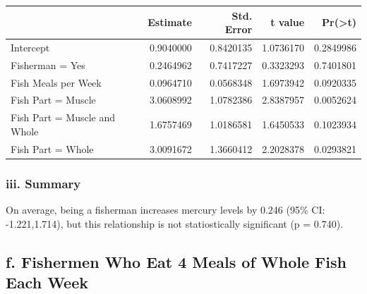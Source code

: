 \documentclass[]{article}
\newenvironment{Shaded}{\begin{snugshade}}{\end{snugshade}}
\newcommand{\DataTypeTok}[1]{\textcolor[rgb]{0.13,0.29,0.53}{#1}}
\newcommand{\KeywordTok}[1]{\textcolor[rgb]{0.13,0.29,0.53}{\textbf{#1}}}
\newcommand{\NormalTok}[1]{#1}
\newcommand{\OperatorTok}[1]{\textcolor[rgb]{0.81,0.36,0.00}{\textbf{#1}}}
\newcommand{\StringTok}[1]{\textcolor[rgb]{0.31,0.60,0.02}{#1}}
\begin{document}
\begin{Shaded}
\end{Shaded}

\begin{longtable}[]{@{}lrrrr@{}}
\toprule
& Estimate & Std. Error & t value &
Pr(\textgreater{}\textbar{}t\textbar{})\tabularnewline
\midrule
\endhead
Intercept & 0.9040000 & 0.8420135 & 1.0736170 & 0.2849986\tabularnewline
Fisherman = Yes & 0.2464962 & 0.7417227 & 0.3323293 &
0.7401801\tabularnewline
Fish Meals per Week & 0.0964710 & 0.0568348 & 1.6973942 &
0.0920335\tabularnewline
Fish Part = Muscle & 3.0608992 & 1.0782386 & 2.8387957 &
0.0052624\tabularnewline
Fish Part = Muscle and Whole & 1.6757469 & 1.0186581 & 1.6450533 &
0.1023934\tabularnewline
Fish Part = Whole & 3.0091672 & 1.3660412 & 2.2028378 &
0.0293821\tabularnewline
\bottomrule
\end{longtable}

\hypertarget{iii.-summary}{%
\subsubsection{iii. Summary}\label{iii.-summary}}

On average, being a fisherman increases mercury levels by 0.246 (95\%
CI: -1.221,1.714), but this relationship is not statiostically
significant (p = 0.740).

\hypertarget{f.-fishermen-who-eat-4-meals-of-whole-fish-each-week}{%
\subsection{f. Fishermen Who Eat 4 Meals of Whole Fish Each
Week}\label{f.-fishermen-who-eat-4-meals-of-whole-fish-each-week}}
\end{document}
